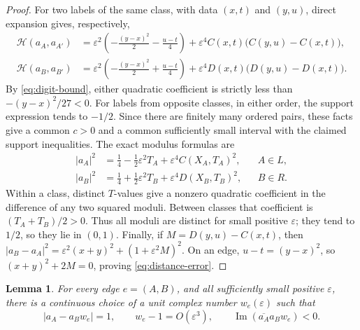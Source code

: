 \documentclass[a4paper,11pt]{amsart}
\newtheorem{lemma}[theorem]{Lemma}
\theoremstyle{remark}
\newcommand{\Hh}{\mathcal H}
\begin{document}
\begin{proof}
For two labels of the same class, with data $(x,t)$ and $(y,u)$, direct
expansion gives, respectively,
\begin{align*}
 \Hh(a_A,a_{A'})
 &=\varepsilon^2\left(-\frac{(y-x)^2}{2}-\frac{u-t}{4}\right)
   +\varepsilon^4 C(x,t)\bigl(C(y,u)-C(x,t)\bigr),\\
 \Hh(a_B,a_{B'})
 &=\varepsilon^2\left(-\frac{(y-x)^2}{2}+\frac{u-t}{4}\right)
   +\varepsilon^4 D(x,t)\bigl(D(y,u)-D(x,t)\bigr).
\end{align*}
By \eqref{eq:digit-bound}, either quadratic coefficient is strictly less
than $-(y-x)^2/27<0$.
For labels from opposite classes, in either order, the support
expression tends to $-1/2$.
Since there are finitely many ordered pairs, these facts give a common
$c>0$ and a common sufficiently small interval with the claimed support
inequalities.
The exact modulus formulas are
\begin{equation}\label{eq:radii}
 \begin{aligned}
 |a_A|^2&=\tfrac14-\tfrac12\varepsilon^2T_A
              +\varepsilon^4 C(X_A,T_A)^2,&&A\in L,\\
 |a_B|^2&=\tfrac14+\tfrac12\varepsilon^2T_B
              +\varepsilon^4 D(X_B,T_B)^2,&&B\in R.
 \end{aligned}
\end{equation}
Within a class, distinct $T$-values give a nonzero quadratic coefficient
in the difference of any two squared moduli. Between classes that
coefficient is $(T_A+T_B)/2>0$. Thus all moduli are distinct for small
positive $\varepsilon$; they tend to $1/2$, so they lie in $(0,1)$.
Finally, if $M=D(y,u)-C(x,t)$, then
$|a_B-a_A|^2=\varepsilon^2(x+y)^2+(1+\varepsilon^2M)^2$.
On an edge, $u-t=(y-x)^2$, so $(x+y)^2+2M=0$, proving
\eqref{eq:distance-error}.
\end{proof}

\begin{lemma}\label{lem:correction}
For every edge $e=(A,B)$, and all sufficiently small positive
$\varepsilon$, there is a continuous choice of a unit complex number
$w_e(\varepsilon)$ such that
\begin{equation}\label{eq:correction}
 |a_A-a_Bw_e|=1,\qquad
 w_e-1=O(\varepsilon^3),\qquad
 \operatorname{Im}(\overline{a_A}a_Bw_e)<0.
\end{equation}
\end{lemma}
\end{document}
